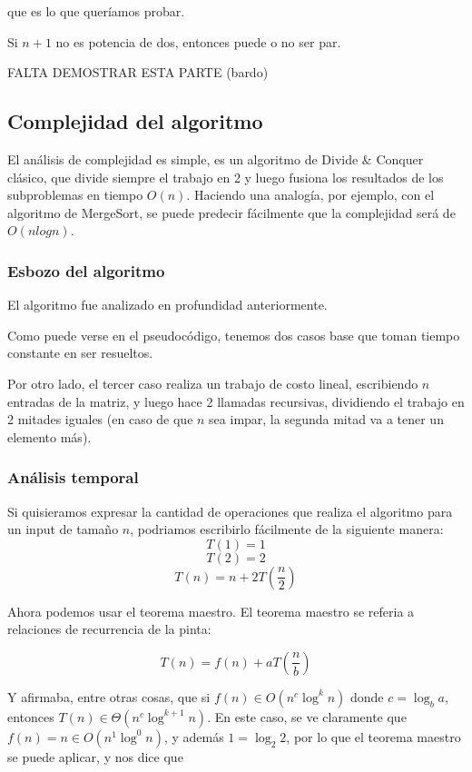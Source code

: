 que es lo que queríamos probar.

\par Si $n+1$ no es potencia de dos, entonces puede o no ser par.

FALTA DEMOSTRAR ESTA PARTE (bardo)

\subsection{Complejidad del algoritmo}

El análisis de complejidad es simple, es un algoritmo de Divide \& Conquer clásico, que divide siempre el trabajo en 2 y luego fusiona los resultados de los subproblemas en tiempo $O(n)$. Haciendo una analogía, por ejemplo, con el algoritmo de MergeSort, se puede predecir fácilmente que la complejidad será de $O(nlogn)$.

\subsubsection{Esbozo del algoritmo}

El algoritmo fue analizado en profundidad anteriormente. 

Como puede verse en el pseudocódigo, tenemos dos casos base que toman tiempo constante en ser resueltos.

Por otro lado, el tercer caso realiza un trabajo de costo lineal, escribiendo $n$ entradas de la matriz, y luego hace 2 llamadas recursivas, dividiendo el trabajo en 2 mitades iguales (en caso de que $n$ sea impar, la segunda mitad va a tener un elemento más).

\subsubsection{Análisis temporal}
Si quisieramos expresar la cantidad de operaciones que realiza el algoritmo para un input de tamaño $n$, podriamos escribirlo fácilmente de la siguiente manera:
\[T(1) = 1\]
\[T(2) = 2\]
\[T(n) = n + 2 T \left(\frac{n}{2}\right)\]

Ahora podemos usar el teorema maestro. El teorema maestro se referia a relaciones de recurrencia de la pinta:

\[T(n) = f(n) + a T\left(\frac{n}{b}\right)\]

Y afirmaba, entre otras cosas, que si $f(n) \in O(n^c \log^k n)$ donde $c = \log_b a$, entonces $T(n) \in \Theta(n^c \log^{k+1} n)$. En este caso, se ve claramente que $f(n) = n \in O(n^1 \log^0 n)$, y además $1 = \log_2 2$, por lo que el teorema maestro se puede aplicar, y nos dice que

